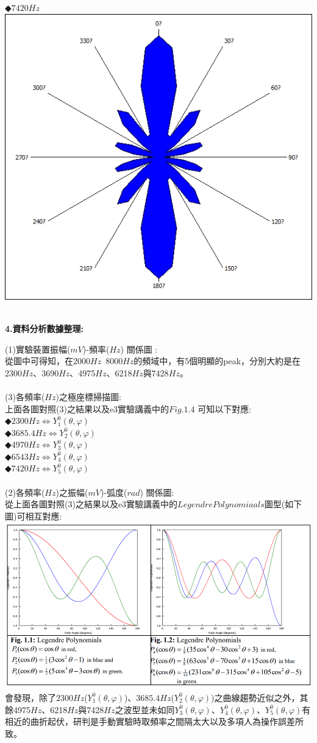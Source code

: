 \documentclass[UTF8]{ctexart}
\begin{document}
\begin{CJK*}{UTF8}{song}
◆$7420 Hz$ \\
\includegraphics[width = .3\textwidth]{329_7420.jpg} \\
 \\
\newpage %


\begin{large}
\textbf{4.資料分析數據整理: } \\
\end{large}
(1)實驗裝置振幅($mV$)-頻率($Hz$) 關係圖 :\\ 
從圖中可得知，在2000$Hz$~8000$Hz$的頻域中，有5個明顯的peak，分別大約是在2300$Hz$、3690$Hz$、4975$Hz$、6218$Hz$與7428$Hz$。 \\
\\
(3)各頻率($Hz$)之極座標掃描圖: \\
上面各圖對照(3)之結果以及e3實驗講義中的$Fig. 1.4$ 可知以下對應: \\
◆$2300 Hz  \iff  Y^{0}_{1}(\theta,\varphi)$  \\
◆$3685.4 Hz  \iff  Y^{0}_{2}(\theta,\varphi)$  \\
◆$4970 Hz  \iff  Y^{0}_{3}(\theta,\varphi)$  \\
◆$6543 Hz  \iff  Y^{0}_{4}(\theta,\varphi)$  \\
◆$7420 Hz  \iff  Y^{0}_{5}(\theta,\varphi)$  \\
\\
(2)各頻率($Hz$)之振幅($mV$)-弧度($rad$) 關係圖: \\
從上面各圖對照(3)之結果以及e3實驗講義中的$Legendre Polynomiaals$圖型(如下圖)可相互對應: \\
\includegraphics[width = .8\textwidth]{lp.png} \\
會發現，除了$2300 Hz$($Y^{0}_{1}(\theta,\varphi)$)、$3685.4 Hz$($Y^{0}_{2}(\theta,\varphi)$)之曲線趨勢近似之外，其餘4975$Hz$、6218$Hz$與7428$Hz$之波型並未如同$Y^{0}_{3}(\theta,\varphi)$、$Y^{0}_{4}(\theta,\varphi)$、$Y^{0}_{5}(\theta,\varphi)$有相近的曲折起伏，研判是手動實驗時取頻率之間隔太大以及多項人為操作誤差所致。 \\
\\


\end{CJK*}
\end{document}
